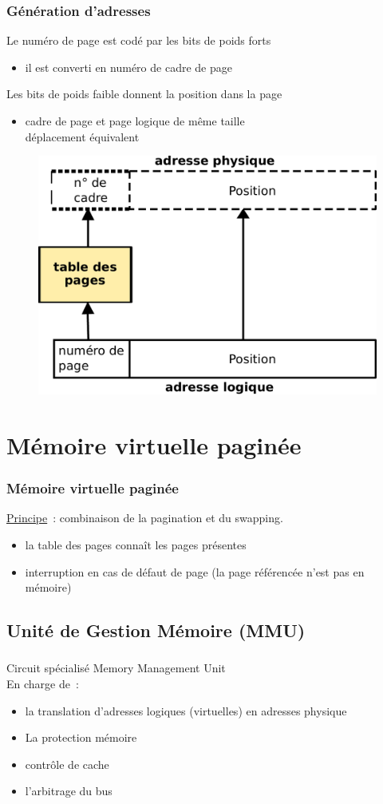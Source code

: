 \begin{frame}
  \frametitle{Génération d'adresses}
  Le \alert{numéro de page} est codé par les bits de poids forts
  \begin{itemize}
  \item il est converti en numéro de \alert{cadre de page}
  \end{itemize}
  Les bits de poids faible donnent la \alert{position dans la page}
  \begin{itemize}
  \item cadre de page et page logique de même taille\\
     déplacement équivalent 
  \end{itemize}
  \begin{figure}
    \includegraphics[width=0.6\linewidth]{fig2/generation-pagination}
  \end{figure}
\end{frame}


\section{Mémoire virtuelle paginée}
\begin{frame}
  \frametitle{Mémoire virtuelle paginée}
  \underline{Principe}~: combinaison de la pagination et du swapping.  
  \begin{itemize}
  \item la table des pages connaît les pages présentes 
  \item interruption en cas de \alert{défaut de page} (la page référencée n'est pas en mémoire)
  \end{itemize}
\end{frame}

\subsection{Unité de Gestion Mémoire (MMU)}
\begin{frame}
  \frametitle{\insertsubsection}

  Circuit spécialisé \alert{Memory Management Unit}\\
 
  En charge de~:
  \begin{itemize}
  \item la translation d'adresses logiques (virtuelles) en adresses physique
  \item La protection mémoire 
  \item contrôle de cache
  \item l'arbitrage du bus
  \end{itemize}
\end{frame}


